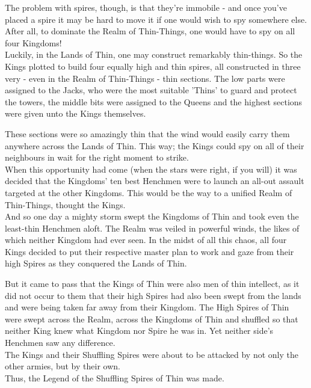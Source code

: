 \documentclass[11pt]{article} %
\begin{document}
\noindent
The problem with spires, though, is that they’re immobile - and once you’ve placed a spire it may be hard to move it if one would wish to spy somewhere else. After all, to dominate the Realm of Thin-Things, one would have to spy on all four Kingdoms! \\

\noindent
Luckily, in the Lands of Thin, one may construct remarkably thin-things. So the Kings plotted to build four equally high and thin spires, all constructed in three very - even in the Realm of Thin-Things - thin sections. The low parts were assigned to the Jacks, who were the most suitable 'Thins' to guard and protect the towers, the middle bits were assigned to the Queens and the highest sections were given unto the Kings themselves.

\noindent
These sections were so amazingly thin that the wind would easily carry them anywhere across the Lands of Thin. This way; the Kings could spy on all of their neighbours in wait for the right moment to strike. \\

\noindent
When this opportunity had come (when the stars were right, if you will) it was decided that the Kingdoms’ ten best Henchmen were to launch an all-out assault targeted at the other Kingdoms. This would be the way to a unified Realm of Thin-Things, thought the Kings. \\
And so one day a mighty storm swept the Kingdoms of Thin and took even the least-thin Henchmen aloft. The Realm was veiled in powerful winds, the likes of which neither Kingdom had ever seen. In the midst of all this chaos, all four Kings decided to put their respective master plan to work and gaze from their high Spires as they conquered the Lands of Thin.

\noindent
But it came to pass that the Kings of Thin were also men of thin intellect, as it did not occur to them that their high Spires had also been swept from the lands and were being taken far away from their Kingdom. The High Spires of Thin were swept across the Realm, across the Kingdoms of Thin and shuffled so that neither King knew what Kingdom nor Spire he was in.
Yet neither side's Henchmen saw any difference. \\
\noindent
The Kings and their Shuffling Spires were about to be attacked by not only the other armies, but by their own. \\

\noindent Thus, the Legend of the Shuffling Spires of Thin was made. \\
\end{document}
